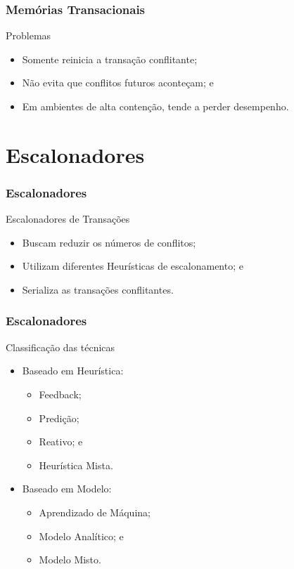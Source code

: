 \documentclass[10pt, pdf,xcolor=pdftex,dvipsnames,table]{beamer}
\begin{document}
\begin{frame} \frametitle{Memórias Transacionais}
    \begin{alertblock}{Problemas}
        \begin{itemize}
        	\item Somente reinicia a transação conflitante;
        	\item Não evita que conflitos futuros aconteçam; e
        	\item Em ambientes de alta contenção, tende a perder desempenho.
        \end{itemize}
    \end{alertblock}
\end{frame}

\section{Escalonadores}
\begin{frame} \frametitle{Escalonadores}
\begin{block}{Escalonadores de Transações}
\begin{itemize}
	\item Buscam reduzir os números de conflitos;
	\item Utilizam diferentes Heurísticas de escalonamento; e
	\item Serializa as transações conflitantes.
\end{itemize}
\end{block}
\end{frame}

\begin{frame} \frametitle{Escalonadores}
\begin{block}{Classificação das técnicas}
\begin{itemize}
	\item Baseado em Heurística:
	\begin{itemize}
	    \item Feedback;
	    \item Predição;
	    \item Reativo; e
	    \item Heurística Mista.
	\end{itemize}
	\item Baseado em Modelo:
	\begin{itemize}
	    \item Aprendizado de Máquina;
	    \item Modelo Analítico; e
	    \item Modelo Misto.
	\end{itemize}
\end{itemize}
\end{block}
\end{frame}
\end{document}
